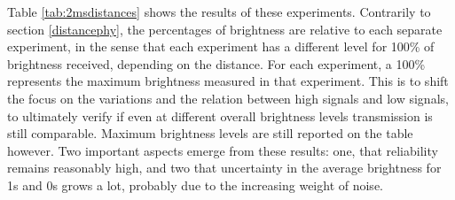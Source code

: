 Table \ref{tab:2msdistances} shows the results of these experiments.
Contrarily to section \ref{distancephy}, the percentages of brightness are relative to each separate experiment, in the sense that each experiment has a different level for 100\% of brightness received, depending on the distance.
For each experiment, a 100\% represents the maximum brightness measured in that experiment.
This is to shift the focus on the variations and the relation between high signals and low signals, to ultimately verify if even at different overall brightness levels transmission is still comparable.
Maximum brightness levels are still reported on the table however.
Two important aspects emerge from these results: one, that reliability remains reasonably high, and two that uncertainty in the average brightness for 1s and 0s grows a lot, probably due to the increasing weight of noise.

